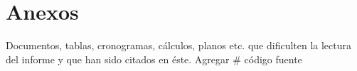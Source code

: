 \chapter{Anexos}

Documentos, tablas, cronogramas, c\'alculos, planos etc. que dificulten la lectura del informe y que han sido citados en \'este. Agregar \# c\'odigo fuente